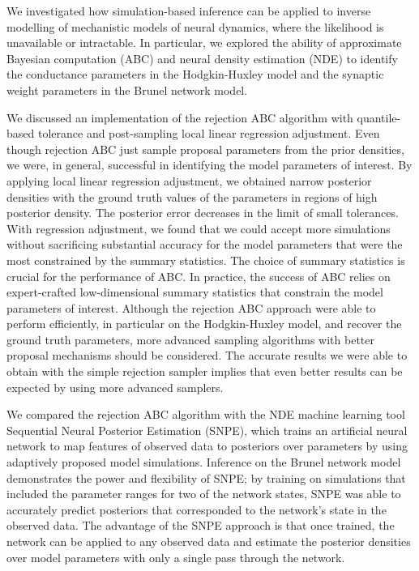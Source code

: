 We investigated how simulation-based inference can be applied to inverse modelling of mechanistic models of neural dynamics, where the likelihood is unavailable or intractable. In particular, we explored the ability of approximate Bayesian computation (ABC) and neural density estimation (NDE) to identify the conductance parameters in the Hodgkin-Huxley model and the synaptic weight parameters in the Brunel network model. 

We discussed an implementation of the rejection ABC algorithm with quantile-based tolerance and post-sampling local linear regression adjustment. Even though rejection ABC just sample proposal parameters from the prior densities, we were, in general, successful in identifying the model parameters of interest. By applying local linear regression adjustment, we obtained narrow posterior densities with the ground truth values of the parameters in regions of high posterior density. The posterior error decreases in the limit of small tolerances. With regression adjustment, we found that we could accept more simulations without sacrificing substantial accuracy for the model parameters that were the most constrained by the summary statistics. The choice of summary statistics is crucial for the performance of ABC. In practice, the success of ABC relies on expert-crafted low-dimensional summary statistics that constrain the model parameters of interest. Although the rejection ABC approach were able to perform efficiently, in particular on the Hodgkin-Huxley model, and recover the ground truth parameters, more advanced sampling algorithms with better proposal mechanisms should be considered. The accurate results we were able to obtain with the simple rejection sampler implies that even better results can be expected by using more advanced samplers. 

We compared the rejection ABC algorithm with the NDE machine learning tool Sequential Neural Posterior Estimation (SNPE), which trains an artificial neural network to map features of observed data to posteriors over parameters by using adaptively proposed model simulations. Inference on the Brunel network model demonstrates the power and flexibility of SNPE; by training on simulations that included the parameter ranges for two of the network states, SNPE was able to accurately predict posteriors that corresponded to the network's state in the observed data. The advantage of the SNPE approach is that once trained, the network can be applied to any observed data and estimate the posterior densities over model parameters with only a single pass through the network. 


